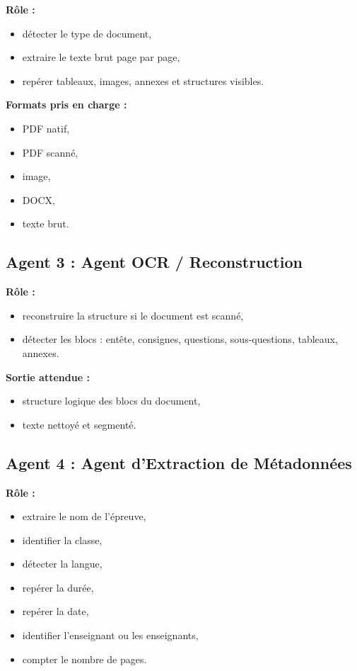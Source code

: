 \documentclass[12pt,a4paper]{article}
\begin{document}
\textbf{Rôle :}
\begin{itemize}[leftmargin=1cm]
    \item détecter le type de document,
    \item extraire le texte brut page par page,
    \item repérer tableaux, images, annexes et structures visibles.
\end{itemize}

\textbf{Formats pris en charge :}
\begin{itemize}[leftmargin=1cm]
    \item PDF natif,
    \item PDF scanné,
    \item image,
    \item DOCX,
    \item texte brut.
\end{itemize}

\subsection*{Agent 3 : Agent OCR / Reconstruction}

\textbf{Rôle :}
\begin{itemize}[leftmargin=1cm]
    \item reconstruire la structure si le document est scanné,
    \item détecter les blocs : entête, consignes, questions, sous-questions, tableaux, annexes.
\end{itemize}

\textbf{Sortie attendue :}
\begin{itemize}[leftmargin=1cm]
    \item structure logique des blocs du document,
    \item texte nettoyé et segmenté.
\end{itemize}

\subsection*{Agent 4 : Agent d’Extraction de Métadonnées}

\textbf{Rôle :}
\begin{itemize}[leftmargin=1cm]
    \item extraire le nom de l’épreuve,
    \item identifier la classe,
    \item détecter la langue,
    \item repérer la durée,
    \item repérer la date,
    \item identifier l’enseignant ou les enseignants,
    \item compter le nombre de pages.
\end{itemize}
\end{document}
